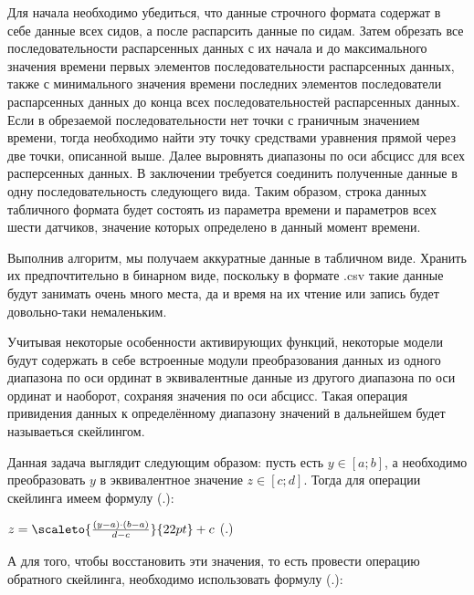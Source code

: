 {  \par \redline Для начала необходимо убедиться, что данные строчного формата содержат в себе данные всех сидов, а после распарсить данные по сидам. Затем обрезать все последовательности распарсенных данных с их начала и до максимального значения времени первых элементов последовательности распарсенных данных, также с минимального значения времени последних элементов последователи распарсенных данных до конца всех последовательностей распарсенных данных. Если в обрезаемой последовательности нет точки с граничным значением времени, тогда необходимо найти эту точку средствами уравнения прямой через две точки, описанной выше. Далее выровнять диапазоны по оси абсцисс для всех расперсенных данных. В заключении требуется соединить полученные данные в одну последовательность следующего вида. Таким образом, строка данных табличного формата будет состоять из параметра времени и параметров всех шести датчиков, значение которых определено в данный момент времени. 

  \par \redline Выполнив алгоритм, мы получаем аккуратные данные в табличном виде. Хранить их предпочтительно в бинарном виде, поскольку в формате .csv такие данные будут занимать очень много места, да и время на их чтение или запись будет довольно-таки немаленьким. 

  \par \redline Учитывая некоторые особенности активирующих функций, некоторые модели будут содержать в себе встроенные модули преобразования данных из одного диапазона по оси ординат в эквивалентные данные из другого диапазона по оси ординат и наоборот, сохраняя значения по оси абсцисс. Такая операция привидения данных к определённому диапазону значений в дальнейшем будет называеться скейлингом.

  \par \redline Данная задача выглядит следующим образом: пусть есть $y \in \left[a; b\right]$, а необходимо преобразовать $y$ в эквивалентное значение $z \in \left[c; d\right]$. Тогда для операции скейлинга имеем формулу (\thechaptercntr .\theformulacntr):

  \formulaspace \par \redline
    $z = \scaleto{\frac{\left(y - a\right) \cdot \left(b - a\right)}{d - c}}{22pt} + c$
    \hfill (\thechaptercntr .\theformulacntr) \redline
  \formulaspace \addtocounter{formulacntr}{1}

  \par \redline А для того, чтобы восстановить эти значения, то есть провести операцию обратного скейлинга, необходимо использовать формулу (\thechaptercntr .\theformulacntr): 

}
